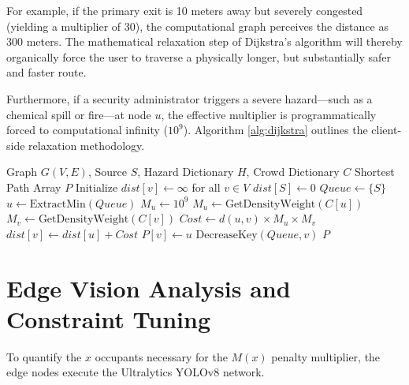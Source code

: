 \documentclass[conference]{IEEEtran}
\begin{document}
For example, if the primary exit is 10 meters away but severely congested (yielding a multiplier of
30), the computational graph perceives the distance as 300 meters. The mathematical relaxation step
of Dijkstra's algorithm will thereby organically force the user to traverse a physically longer, but
substantially safer and faster route.

Furthermore, if a security administrator triggers a severe hazard—such as a chemical spill or
fire—at node $u$, the effective multiplier is programmatically forced to computational infinity
($10^9$). Algorithm \ref{alg:dijkstra} outlines the client-side relaxation methodology.

\begin{algorithm}[htbp]
\caption{Dynamic Crowd-Weighted Dijkstra Relaxation}\label{alg:dijkstra}
\begin{algorithmic}[1]
\REQUIRE Graph $G(V,E)$, Source $S$, Hazard Dictionary $H$, Crowd Dictionary $C$
\ENSURE Shortest Path Array $P$
\STATE Initialize $dist[v] \leftarrow \infty$ for all $v \in V$
\STATE $dist[S] \leftarrow 0$
\STATE $Queue \leftarrow \{S\}$
    \STATE $u \leftarrow \text{ExtractMin}(Queue)$
        \STATE $M_u \leftarrow 10^9$ 
    \ELSE
        \STATE $M_u \leftarrow \text{GetDensityWeight}(C[u])$
    \ENDIF
        \STATE $M_v \leftarrow \text{GetDensityWeight}(C[v])$
        \STATE $Cost \leftarrow d(u,v) \times M_u \times M_v$
            \STATE $dist[v] \leftarrow dist[u] + Cost$
            \STATE $P[v] \leftarrow u$
            \STATE $\text{DecreaseKey}(Queue, v)$
        \ENDIF
    \ENDFOR
\ENDWHILE
\RETURN $P$
\end{algorithmic}
\end{algorithm}

\section{Edge Vision Analysis and Constraint Tuning}

To quantify the $x$ occupants necessary for the $M(x)$ penalty multiplier, the edge nodes execute
the Ultralytics YOLOv8 network.
\end{document}

